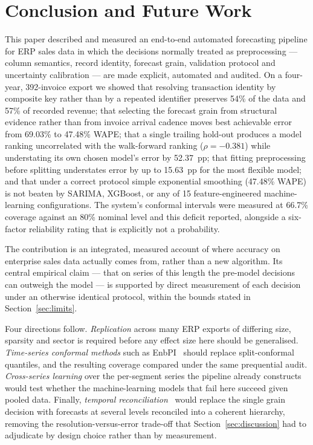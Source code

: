 \documentclass[conference]{IEEEtran}
\begin{document}
\section{Conclusion and Future Work}
\label{sec:conclusion}

This paper described and measured an end-to-end automated forecasting pipeline
for ERP sales data in which the decisions normally treated as preprocessing
--- column semantics, record identity, forecast grain, validation protocol and
uncertainty calibration --- are made explicit, automated and audited. On a
four-year, 392-invoice export we showed that resolving transaction identity by
composite key rather than by a repeated identifier preserves 54\% of the data
and 57\% of recorded revenue; that selecting the forecast grain from
structural evidence rather than from invoice arrival cadence moves best
achievable error from 69.03\% to 47.48\% WAPE; that a single trailing hold-out
produces a model ranking uncorrelated with the walk-forward ranking
($\rho=-0.381$) while understating its own chosen model's error by 52.37~pp;
that fitting preprocessing before splitting understates error by up to
15.63~pp for the most flexible model; and that under a correct protocol simple
exponential smoothing (47.48\% WAPE) is not beaten by SARIMA, XGBoost, or any
of 15 feature-engineered machine-learning configurations. The system's
conformal intervals were measured at 66.7\% coverage against an 80\% nominal
level and this deficit reported, alongside a six-factor reliability rating
that is explicitly not a probability.

The contribution is an integrated, measured account of where accuracy on
enterprise sales data actually comes from, rather than a new algorithm. Its
central empirical claim --- that on series of this length the pre-model
decisions can outweigh the model --- is supported by direct measurement of each
decision under an otherwise identical protocol, within the bounds stated in
Section~\ref{sec:limits}.

Four directions follow. \emph{Replication} across many ERP exports of differing
size, sparsity and sector is required before any effect size here should be
generalised. \emph{Time-series conformal methods} such as
EnbPI~\cite{xu2021enbpi} should replace split-conformal quantiles, and the
resulting coverage compared under the same prequential audit.
\emph{Cross-series learning} over the per-segment series the pipeline already
constructs would test whether the machine-learning models that fail here
succeed given pooled data. Finally, \emph{temporal
reconciliation}~\cite{athanasopoulos2017temporal} would replace the single
grain decision with forecasts at several levels reconciled into a coherent
hierarchy, removing the resolution-versus-error trade-off that
Section~\ref{sec:discussion} had to adjudicate by design choice rather than by
measurement.
\end{document}

